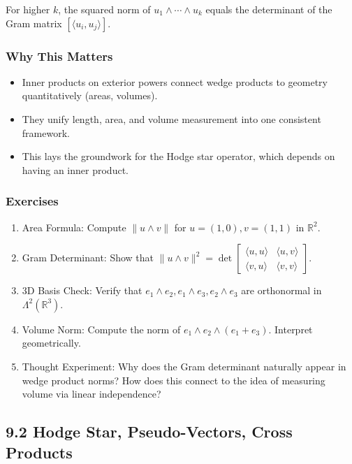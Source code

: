 \documentclass[
  letterpaper,
  DIV=11,
  numbers=noendperiod]{scrreprt}
\providecommand{\tightlist}{%
  \setlength{\itemsep}{0pt}\setlength{\parskip}{0pt}}
\begin{document}
For higher \(k\), the squared norm of \(u_1 \wedge \cdots \wedge u_k\)
equals the determinant of the Gram matrix \([\langle u_i,u_j \rangle]\).

\subsubsection{Why This Matters}\label{why-this-matters-20}

\begin{itemize}
\tightlist
\item
  Inner products on exterior powers connect wedge products to geometry
  quantitatively (areas, volumes).
\item
  They unify length, area, and volume measurement into one consistent
  framework.
\item
  This lays the groundwork for the Hodge star operator, which depends on
  having an inner product.
\end{itemize}

\subsubsection{Exercises}\label{exercises-32}

\begin{enumerate}
\def\labelenumi{\arabic{enumi}.}
\item
  Area Formula: Compute \(\|u \wedge v\|\) for \(u=(1,0), v=(1,1)\) in
  \(\mathbb{R}^2\).
\item
  Gram Determinant: Show that
  \(\|u \wedge v\|^2 = \det \begin{bmatrix} \langle u,u \rangle & \langle u,v \rangle \\ \langle v,u \rangle & \langle v,v \rangle \end{bmatrix}\).
\item
  3D Basis Check: Verify that
  \(e_1 \wedge e_2, e_1 \wedge e_3, e_2 \wedge e_3\) are orthonormal in
  \(\Lambda^2(\mathbb{R}^3)\).
\item
  Volume Norm: Compute the norm of \(e_1 \wedge e_2 \wedge (e_1+e_3)\).
  Interpret geometrically.
\item
  Thought Experiment: Why does the Gram determinant naturally appear in
  wedge product norms? How does this connect to the idea of measuring
  volume via linear independence?
\end{enumerate}

\subsection{9.2 Hodge Star, Pseudo-Vectors, Cross
Products}\label{hodge-star-pseudo-vectors-cross-products}
\end{document}

